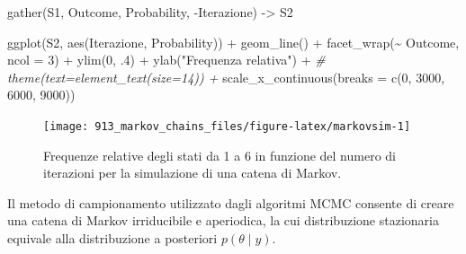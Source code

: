 \documentclass[
  10pt,
  italian,
  a4paper,
  extrafontsizes,onecolumn,openright
  ]{memoir}
\makeatletter
\newenvironment{Shaded}{\begin{snugshade}}{\end{snugshade}}
\newcommand{\AttributeTok}[1]{\textcolor[rgb]{0.77,0.63,0.00}{#1}}
\newcommand{\CommentTok}[1]{\textcolor[rgb]{0.56,0.35,0.01}{\textit{#1}}}
\newcommand{\DecValTok}[1]{\textcolor[rgb]{0.00,0.00,0.81}{#1}}
\newcommand{\FunctionTok}[1]{\textcolor[rgb]{0.00,0.00,0.00}{#1}}
\newcommand{\NormalTok}[1]{#1}
\newcommand{\OtherTok}[1]{\textcolor[rgb]{0.56,0.35,0.01}{#1}}
\newcommand{\SpecialCharTok}[1]{\textcolor[rgb]{0.00,0.00,0.00}{#1}}
\newcommand{\StringTok}[1]{\textcolor[rgb]{0.31,0.60,0.02}{#1}}
\newcommand{\MemoirChapStyle}{daleif1}
\newcommand{\MemoirPageStyle}{Ruled}
\newlength\widthw %
\newcommand*{\SmallMargins}{
  \setlrmarginsandblock{1.5in}{1.5in}{*}
  \setmarginnotes{0.1in}{0.1in}{0.1in}
 \setulmarginsandblock{1.5in}{1in}{*}
  \checkandfixthelayout
  \ch@ngetext
  \clearpage
  \setlength{\widthw}{\textwidth+\marginparsep+\marginparwidth}
  \footnotesatfoot
  \chapterstyle{\MemoirChapStyle}  %
  \pagestyle{\MemoirPageStyle}
}
\newcommand{\LargeMargins}{\SmallMargins}
\makeatother
\begin{document}
\begin{Shaded}
\begin{Highlighting}[]
\FunctionTok{gather}\NormalTok{(S1, Outcome, Probability, }\SpecialCharTok{{-}}\NormalTok{Iterazione) }\OtherTok{{-}\textgreater{}}\NormalTok{ S2}

\FunctionTok{ggplot}\NormalTok{(S2, }\FunctionTok{aes}\NormalTok{(Iterazione, Probability)) }\SpecialCharTok{+}
  \FunctionTok{geom\_line}\NormalTok{() }\SpecialCharTok{+}
  \FunctionTok{facet\_wrap}\NormalTok{(}\SpecialCharTok{\textasciitilde{}}\NormalTok{ Outcome, }\AttributeTok{ncol =} \DecValTok{3}\NormalTok{) }\SpecialCharTok{+}
  \FunctionTok{ylim}\NormalTok{(}\DecValTok{0}\NormalTok{, .}\DecValTok{4}\NormalTok{) }\SpecialCharTok{+}
  \FunctionTok{ylab}\NormalTok{(}\StringTok{"Frequenza relativa"}\NormalTok{) }\SpecialCharTok{+}
  \CommentTok{\# theme(text=element\_text(size=14))  +}
  \FunctionTok{scale\_x\_continuous}\NormalTok{(}\AttributeTok{breaks =} \FunctionTok{c}\NormalTok{(}\DecValTok{0}\NormalTok{, }\DecValTok{3000}\NormalTok{, }\DecValTok{6000}\NormalTok{, }\DecValTok{9000}\NormalTok{))}
\end{Highlighting}
\end{Shaded}

\begin{figure}[h]

{\centering \texttt{[image: 913\_markov\_chains\_files/figure-latex/markovsim-1]} 

}

\caption{Frequenze relative degli stati da 1 a 6 in funzione del numero di iterazioni per la simulazione di una catena di Markov.}\label{fig:markovsim}
\end{figure}

Il metodo di campionamento utilizzato dagli algoritmi MCMC consente di creare una catena di Markov irriducibile e aperiodica, la cui distribuzione stazionaria equivale alla distribuzione a posteriori \(p(\theta \mid y)\).



\backmatter
\SmallMargins

\printbibliography
\onecolumn




\cleardoublepage
\LargeMargins
\listoffigures






\end{document}
